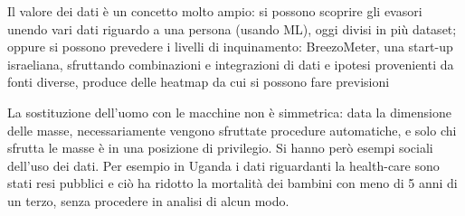 \documentclass[a4page, 11pt]{article}
\begin{document}
Il valore dei dati è un concetto molto ampio: si possono scoprire gli evasori unendo vari dati riguardo a una persona (usando ML), oggi divisi in più dataset; oppure si possono prevedere i livelli di inquinamento: BreezoMeter, una start-up israeliana, sfruttando combinazioni e integrazioni di dati e ipotesi provenienti da fonti diverse, produce delle heatmap da cui si possono fare previsioni

La sostituzione dell'uomo con le macchine non è simmetrica: data la dimensione delle masse, necessariamente vengono sfruttate procedure automatiche, e solo chi sfrutta le masse è in una  posizione di privilegio.
Si hanno però esempi sociali dell'uso dei dati.
Per esempio in Uganda i dati riguardanti la health-care sono stati resi pubblici e ciò ha ridotto la mortalità dei bambini con meno di 5 anni di un
terzo, senza procedere in analisi di alcun modo.
\end{document}
